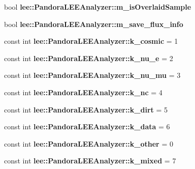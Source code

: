 \begin{DoxyCompactItemize}
\item 
\hypertarget{group__lee_gaf8c9bf05e68b489be6944d9b6ad9075f}{bool {\bfseries lee\-::\-Pandora\-L\-E\-E\-Analyzer\-::m\-\_\-is\-Overlaid\-Sample}}\label{group__lee_gaf8c9bf05e68b489be6944d9b6ad9075f}

\item 
\hypertarget{group__lee_ga9f323d5b266d64aa73a45e50ac3e1fe6}{bool {\bfseries lee\-::\-Pandora\-L\-E\-E\-Analyzer\-::m\-\_\-save\-\_\-flux\-\_\-info}}\label{group__lee_ga9f323d5b266d64aa73a45e50ac3e1fe6}

\item 
\hypertarget{group__lee_ga048d617faeb0aadea21f43c805dadb1f}{const int {\bfseries lee\-::\-Pandora\-L\-E\-E\-Analyzer\-::k\-\_\-cosmic} = 1}\label{group__lee_ga048d617faeb0aadea21f43c805dadb1f}

\item 
\hypertarget{group__lee_ga9d7e6f745c8e67c74f49b904cbfa5d61}{const int {\bfseries lee\-::\-Pandora\-L\-E\-E\-Analyzer\-::k\-\_\-nu\-\_\-e} = 2}\label{group__lee_ga9d7e6f745c8e67c74f49b904cbfa5d61}

\item 
\hypertarget{group__lee_gaeeae8fe7055f10e2f6a30892926fd510}{const int {\bfseries lee\-::\-Pandora\-L\-E\-E\-Analyzer\-::k\-\_\-nu\-\_\-mu} = 3}\label{group__lee_gaeeae8fe7055f10e2f6a30892926fd510}

\item 
\hypertarget{group__lee_ga27261a8cfcfebab466011b2952a8969b}{const int {\bfseries lee\-::\-Pandora\-L\-E\-E\-Analyzer\-::k\-\_\-nc} = 4}\label{group__lee_ga27261a8cfcfebab466011b2952a8969b}

\item 
\hypertarget{group__lee_gafa596ee5d7a68568ce5371f17c38ee96}{const int {\bfseries lee\-::\-Pandora\-L\-E\-E\-Analyzer\-::k\-\_\-dirt} = 5}\label{group__lee_gafa596ee5d7a68568ce5371f17c38ee96}

\item 
\hypertarget{group__lee_ga00720d429d223c6bfd351b500b287517}{const int {\bfseries lee\-::\-Pandora\-L\-E\-E\-Analyzer\-::k\-\_\-data} = 6}\label{group__lee_ga00720d429d223c6bfd351b500b287517}

\item 
\hypertarget{group__lee_ga397f9459c5ff25721ca99fa9b9df4880}{const int {\bfseries lee\-::\-Pandora\-L\-E\-E\-Analyzer\-::k\-\_\-other} = 0}\label{group__lee_ga397f9459c5ff25721ca99fa9b9df4880}

\item 
\hypertarget{group__lee_ga75e327e4124da9ee9a1a95a4126be377}{const int {\bfseries lee\-::\-Pandora\-L\-E\-E\-Analyzer\-::k\-\_\-mixed} = 7}\label{group__lee_ga75e327e4124da9ee9a1a95a4126be377}


\end{DoxyCompactItemize}
